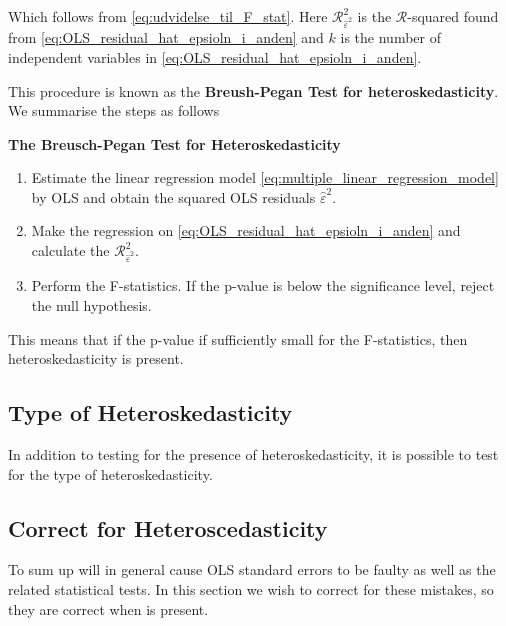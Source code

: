 Which follows from \eqref{eq:udvidelse_til_F_stat}. Here $\mathcal{R}^2_{\hat{\varepsilon}^2}$ is the $\mathcal{R}$-squared found from \eqref{eq:OLS_residual_hat_epsioln_i_anden} and $k$ is the number of independent variables in \eqref{eq:OLS_residual_hat_epsioln_i_anden}. 

This procedure is known as the \textbf{Breush-Pegan Test for heteroskedasticity}. We summarise the steps as follows

\textbf{The Breusch-Pegan Test for Heteroskedasticity}
\begin{enumerate}[label=(\roman*)]
    \item Estimate the linear regression model \eqref{eq:multiple_linear_regression_model} by OLS and obtain the squared OLS residuals $\hat{\varepsilon}^2$. 
    \item Make the regression on \eqref{eq:OLS_residual_hat_epsioln_i_anden} and calculate the $\mathcal{R}^2_{\hat{\varepsilon}^2}$. 
    \item Perform the F-statistics. If the p-value is below the significance level, reject the null hypothesis. 
\end{enumerate}

This means that if the p-value if sufficiently small for the F-statistics, then heteroskedasticity is present. 

\begin{example}

\end{example}

\subsection{Type of Heteroskedasticity}
In addition to testing for the presence of heteroskedasticity, it is possible to test for the type of heteroskedasticity. 



\subsection{Correct for Heteroscedasticity}
To sum up \hetero will in general cause OLS standard errors to be faulty as well as the related statistical tests. In this section we wish to correct for these mistakes, so they are correct when \hetero is present.




















